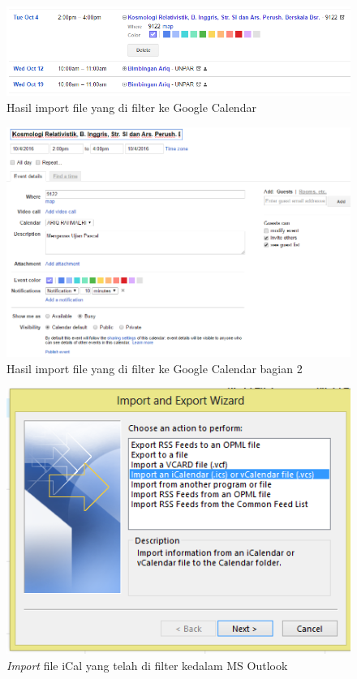 			\begin{figure}[H]
			\centering
			\includegraphics[scale=0.7]{Gambar/hasilGCFilterEksperimental}
			\caption{Hasil import file yang di filter ke Google Calendar}
			\label{fig:hasilGCFilterEksperimental}
			\end{figure}
			
			\begin{figure}[H]
			\centering
			\includegraphics[scale=0.6]{Gambar/hasilGCFilterEksperimental2}
			\caption{Hasil import file yang di filter ke Google Calendar bagian 2 }
			\label{fig:hasilGCFilterEksperimental2}
			\end{figure}
			
		
			\begin{figure}[H]
			\centering
			\includegraphics[scale=0.8]{Gambar/importOutlook}
			\caption{\textit{Import} file iCal yang telah di filter kedalam MS Outlook }
			\label{fig:importOutlookFilter}
			\end{figure}
		
